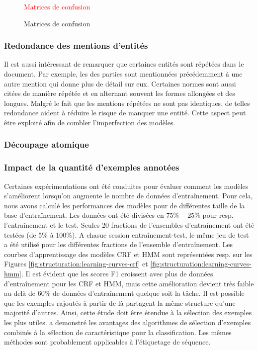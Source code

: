 \begin{figure}[h!]
    \centering
    \textcolor{red}{Matrices de confusion}
    \caption{Matrices de confusion}
    \label{fig:structuration:matrices-confusions}
\end{figure}

\subsubsection{Redondance des mentions d'entités}
Il est aussi intéressant de remarquer que certaines entités sont répétées dans le document. Par exemple, les des parties sont mentionnées précédemment à une autre mention qui donne plus de détail sur eux. Certaines normes sont aussi citées de manière répétée et en alternant souvent les formes allongées et des longues. Malgré le fait que les mentions répétées ne sont pas identiques, de telles redondance aident à réduire le risque de manquer une entité. Cette aspect peut être exploité afin de combler l'imperfection des modèles.

\subsubsection{Découpage atomique}

\subsubsection{Impact de la quantité d'exemples annotées}
Certaines expérimentations ont été conduites pour évaluer comment les modèles s'améliorent lorsqu'on augmente le nombre de données d'entraînement. Pour cela, nous avons calculé les performances des modèles pour de différentes taille de la base d'entraînement. Les données ont été divisées en $75\%-25\%$ pour resp. l'entraînement et le test. Seules 20 fractions de l'ensembles d'entraînement ont été testées (de 5\% à 100\%). A chasue session entraînement-test, le même jeu de test a été utilisé pour les différentes fractions de l'ensemble d'entraînement. Les courbes d'apprentissage des modèles CRF et HMM sont représentées resp. sur les Figures \ref{fig:structuration:learning-curves-crf} et \ref{fig:structuration:learning-curves-hmm}. Il est évident que les scores F1 croissent avec plus de données d'entraînement pour les CRF et HMM, mais cette amélioration devient très faible au-delà de 60\% de données d'entraînement quelque soit la tâche. Il est possible que les exemples rajoutés à partir de là partagent la même structure qu'une majorité d'autres. Ainsi, cette étude doit être étendue à la sélection des exemples les plus utiles. \citet{raman2003exampleSelection} a demonstré les avantages des algorithmes de sélection d'exemples combinés à la sélection de caractéristique pour la classification. Les mêmes méthodes sont probablement applicables à l'étiquetage de séquence.

